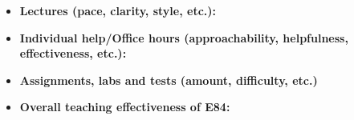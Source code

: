 \begin{itemize}
\item {\bf Lectures (pace, clarity, style, etc.):}


\item {\bf Individual help/Office hours (approachability, helpfulness, effectiveness, etc.):}


\item {\bf Assignments, labs and tests (amount, difficulty, etc.)}


\item {\bf Overall teaching effectiveness of E84:} 


\end{itemize}


